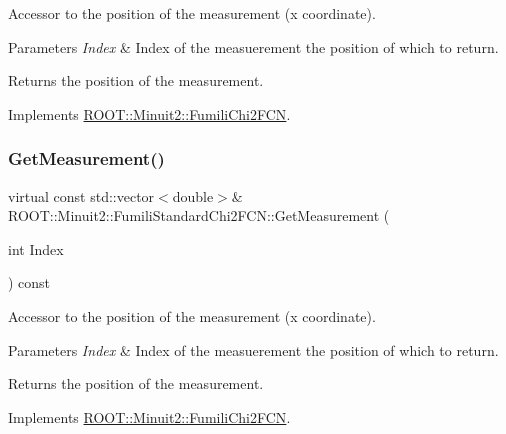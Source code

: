 Accessor to the position of the measurement (x coordinate).


\begin{DoxyParams}{Parameters}
{\em Index} & Index of the measuerement the position of which to return.\\
\hline
\end{DoxyParams}
\begin{DoxyReturn}{Returns}
the position of the measurement. 
\end{DoxyReturn}


Implements \mbox{\hyperlink{classROOT_1_1Minuit2_1_1FumiliChi2FCN_a1831875c53596cd4aa52ea536de53b60}{R\+O\+O\+T\+::\+Minuit2\+::\+Fumili\+Chi2\+F\+CN}}.

\mbox{\label{classROOT_1_1Minuit2_1_1FumiliStandardChi2FCN_a3bbc9a9cb77ce45aa764aa1f6e74349c}} 
\subsubsection{\texorpdfstring{GetMeasurement()}{GetMeasurement()}\hspace{0.1cm}{\footnotesize\ttfamily [2/3]}}
{\footnotesize\ttfamily virtual const std\+::vector$<$double$>$\& R\+O\+O\+T\+::\+Minuit2\+::\+Fumili\+Standard\+Chi2\+F\+C\+N\+::\+Get\+Measurement (\begin{DoxyParamCaption}\item[{int}]{Index }\end{DoxyParamCaption}) const\hspace{0.3cm}{\ttfamily [virtual]}}

Accessor to the position of the measurement (x coordinate).


\begin{DoxyParams}{Parameters}
{\em Index} & Index of the measuerement the position of which to return.\\
\hline
\end{DoxyParams}
\begin{DoxyReturn}{Returns}
the position of the measurement. 
\end{DoxyReturn}


Implements \mbox{\hyperlink{classROOT_1_1Minuit2_1_1FumiliChi2FCN_a1831875c53596cd4aa52ea536de53b60}{R\+O\+O\+T\+::\+Minuit2\+::\+Fumili\+Chi2\+F\+CN}}.

